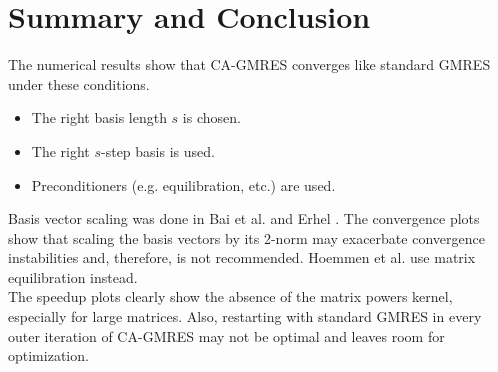 \documentclass{scrartcl}
\numberwithin{equation}{section}
\begin{document}
\section{Summary and Conclusion}
The numerical results show that CA-GMRES converges like standard GMRES under these conditions.
\begin{itemize}
\item The right basis length $s$ is chosen.
\item The right $s$-step basis is used.
\item Preconditioners (e.g. equilibration, etc.) are used.
\end{itemize}
Basis vector scaling was done in Bai et al. \cite{NewtonGMRES_bai_reichel/doi:10.1093/imanum} and Erhel \cite{Erhel95aparallel}.
The convergence plots show that scaling the basis vectors by its 2-norm may exacerbate convergence instabilities and, therefore, is not recommended. Hoemmen et al. \cite{Hoemmen:2010:CKS:1970638} use matrix equilibration instead.\\
The speedup plots clearly show the absence of the matrix powers kernel, especially for large matrices. Also, restarting with standard GMRES in every outer iteration of CA-GMRES may not be optimal and leaves room for optimization.



 \listofalgorithms
 
\end{document}
